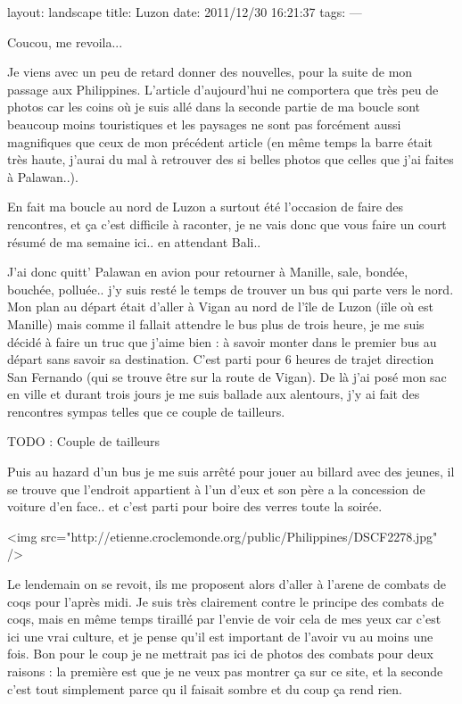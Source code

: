 layout: landscape
title: Luzon
date: 2011/12/30 16:21:37
tags:
---

Coucou, me revoila...

Je viens avec un peu de retard donner des nouvelles, pour la suite de mon passage aux Philippines. L'article d'aujourd'hui ne comportera que très peu de photos car les coins où je suis allé dans la seconde partie de ma boucle sont beaucoup moins touristiques et les paysages ne sont pas forcément aussi magnifiques que ceux de mon précédent article (en même temps la barre était très haute, j'aurai du mal à retrouver des si belles photos que celles que j'ai faites à Palawan..).

En fait ma boucle au nord de Luzon a surtout été l'occasion de faire des rencontres, et ça c'est difficile à raconter, je ne vais donc que vous faire un court résumé de ma semaine ici.. en attendant Bali..

J'ai donc quitt' Palawan en avion pour retourner à Manille, sale, bondée, bouchée, polluée.. j'y suis resté le temps de trouver un bus qui parte vers le nord. Mon plan au départ était d'aller à Vigan au nord de l'île de Luzon (iîle où est Manille) mais comme il fallait attendre le bus plus de trois heure, je me suis décidé à faire un truc que j'aime bien : à savoir monter dans le premier bus au départ sans savoir sa destination. C'est parti pour 6 heures de trajet direction San Fernando (qui se trouve être sur la route de Vigan). De là j'ai posé mon sac en ville et durant trois jours je me suis ballade aux alentours, j'y ai fait des rencontres sympas telles que ce couple de tailleurs.

TODO : Couple de tailleurs

Puis au hazard d'un bus je me suis arrêté pour jouer au billard avec des jeunes, il se trouve que l'endroit appartient à l'un d'eux et son père a la concession de voiture d'en face.. et c'est parti pour boire des verres toute la soirée.

<img src="http://etienne.croclemonde.org/public/Philippines/DSCF2278.jpg" />

Le lendemain on se revoit, ils me proposent alors d'aller à l'arene de combats de coqs pour l'après midi. Je suis très clairement contre le principe des combats de coqs, mais en même temps tiraillé par l'envie de voir cela de mes yeux car c'est ici une vrai culture, et je pense qu'il est important de l'avoir vu au moins une fois. Bon pour le coup je ne mettrait pas ici de photos des combats pour deux raisons : la première est que je ne veux pas montrer ça sur ce site, et la seconde c'est tout simplement parce qu il faisait sombre et du coup ça rend rien.

